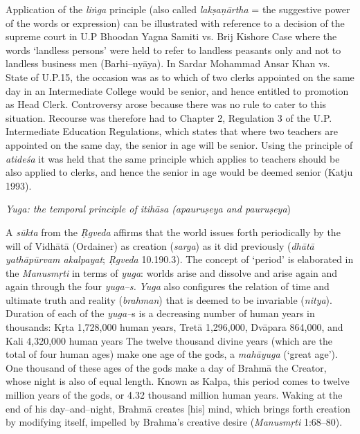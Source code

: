 Application of the \textit{liṅga} principle (also called \textit{lakṣaṇārtha} = the suggestive power of the words or expression) can be illustrated with reference to a decision of the supreme court in U.P Bhoodan Yagna Samiti vs. Brij Kishore Case where the words ‘landless persons’ were held to refer to landless peasants only and not to landless business men (Barhi–nyāya). In Sardar Mohammad Ansar Khan vs. State of U.P.15, the occasion was as to which of two clerks appointed on the same day in an Intermediate College would be senior, and hence entitled to promotion as Head Clerk. Controversy arose because there was no rule to cater to this situation. Recourse was therefore had to Chapter 2, Regulation 3 of the U.P. Intermediate Education Regulations, which states that where two teachers are appointed on the same day, the senior in age will be senior. Using the principle of \textit{atideśa} it was held that the same principle which applies to teachers should be also applied to clerks, and hence the senior in age would be deemed senior (Katju 1993).

\textit{Yuga: the temporal principle of itihāsa (apauruṣeya and pauruṣeya})

A \textit{sūkta} from the \textit{Ṛgveda} affirms that the world issues forth periodically by the will of Vidhātā (Ordainer) as creation (\textit{sarga}) as it did previously (\textit{dhātā yathāpūrvam akalpayat}; \textit{Ṛgveda} 10.190.3). The concept of ‘period’ is elaborated in the \textit{Manusmṛti} in terms of \textit{yuga}: worlds arise and dissolve and arise again and again through the four \textit{yuga–s.} \textit{Yuga} also configures the relation of time and ultimate truth and reality (\textit{brahman}) that is deemed to be invariable (\textit{nitya}). Duration of each of the \textit{yuga–}s is a decreasing number of human years in thousands: Kṛta 1,728,000 human years, Tretā 1,296,000, Dvāpara 864,000, and Kali 4,320,000 human years The twelve thousand divine years (which are the total of four human ages) make one age of the gods, a \textit{mahāyuga} (‘great age’). One thousand of these ages of the gods make a day of Brahmā the Creator, whose night is also of equal length. Known as Kalpa, this period comes to twelve million years of the gods, or 4.32 thousand million human years. Waking at the end of his day–and–night, Brahmā creates [his] mind, which brings forth creation by modifying itself, impelled by Brahma’s creative desire (\textit{Manusmṛti} 1:68–80).

